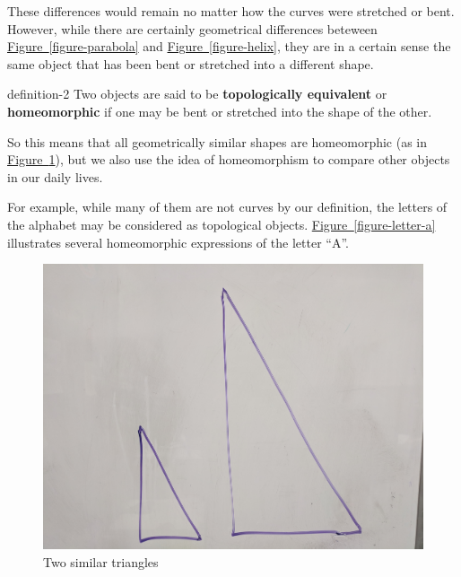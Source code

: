 \documentclass[10pt,]{article}
\newcommand{\terminology}[1]{\textbf{#1}}
\begin{document}
\hypertarget{p-10}{}%
These differences would remain no matter how the curves were stretched or bent. However, while there are certainly geometrical differences beteween \hyperref[figure-parabola]{Figure~\ref{figure-parabola}} and \hyperref[figure-helix]{Figure~\ref{figure-helix}}, they are in a certain sense the same object that has been bent or stretched into a different shape.%
\begin{definition}{}{definition-2}%
\hypertarget{p-11}{}%
Two objects are said to be \terminology{topologically equivalent} or \terminology{homeomorphic} if one may be bent or stretched into the shape of the other.%
\end{definition}
\hypertarget{p-12}{}%
So this means that all geometrically similar shapes are homeomorphic (as in \hyperref[figure-similar-triangles]{Figure~\ref{figure-similar-triangles}}), but we also use the idea of homeomorphism to compare other objects in our daily lives.%
\par
\hypertarget{p-13}{}%
For example, while many of them are not curves by our definition, the letters of the alphabet may be considered as topological objects. \hyperref[figure-letter-a]{Figure~\ref{figure-letter-a}} illustrates several homeomorphic expressions of the letter ``A''.%
\begin{figure}
\centering
\includegraphics[width=1\linewidth]{images/similar-triangles.jpg}
\caption{Two similar triangles\label{figure-similar-triangles}}
\end{figure}
\end{document}
